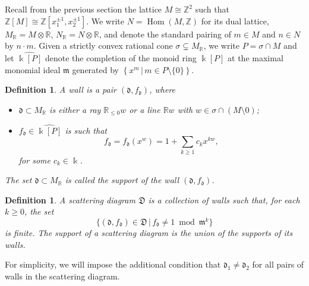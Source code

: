 \documentclass[11pt]{amsart}
\newtheorem{defn}[theorem]{Definition}
\theoremstyle{remark}
\numberwithin{equation}{section}
\newcommand{\RR}{\mathbb{R}}
\newcommand{\ZZ}{\mathbb{Z}}
\newcommand{\fd}{\mathfrak{d}}
\newcommand{\fD}{\mathfrak{D}}
\newcommand{\fm}{\mathfrak{m}}
\newcommand{\Hom}{\operatorname{Hom}}
\begin{document}

Recall from the previous section the lattice $M \cong \ZZ^2$ such that $\ZZ[M] \cong \ZZ[x_1^{\pm 1}, x_2^{\pm 1}]$.  We write $N = \Hom (M, \ZZ)$ for its dual lattice, $M_{\RR} = M\otimes\RR$, $N_{\RR} = N\otimes\RR$, and denote the standard pairing of $m\in M$ and $n\in N$ by $n \cdot m$.  Given a strictly convex rational cone $\sigma \subsetneq M_{\RR}$, we write $P=\sigma \cap M$ and let $\widehat{\Bbbk[P]}$ denote the completion of the monoid ring $\Bbbk[P]$ at the maximal monomial ideal $\fm$ generated by $\left\{x^m \,|\, m\in P\setminus\{0\}\right\}$.

\begin{defn}
  \label{walldef}
  A \emph{wall} is a pair $(\fd, f_{\fd})$, where 
  \begin{itemize}

    \item 
      $\fd \subset M_{\mathbb{R}}$ is either a ray $\RR_{\le 0} w$ or a line
      $\RR w$ with $w\in \sigma \cap(M\setminus 0)$;

    \item 
      $f_{\fd} \in \widehat{\Bbbk [P]}$ is such that 
      \[ 
        f_{\fd} = f_{\fd}(x^w) = 1 + \sum_{k\geq 1} c_k x^{k w},
      \] 
      for some $c_k \in \Bbbk$. 
  \end{itemize}
  The set $\fd \subset M_{\mathbb{R}}$ is called the \emph{support} of the wall
  $(\fd, f_{\fd})$.
\end{defn}

\begin{defn}
  \label{def:scattering_diagram}
  A scattering diagram $\fD$ is a collection of walls such that, for each $k \geq
  0$, the set
  \[
    \{ (\fd, f_{\fd}) \in \fD\, |\, f_{\fd} \neq 1 \bmod \fm^k \}
  \]
  is finite. The support of a scattering diagram is the union of the supports of its walls.%
\end{defn}
For simplicity, we will impose the additional condition that $\fd_1\neq \fd_2$ for all pairs of walls in the scattering diagram.
\end{document}
